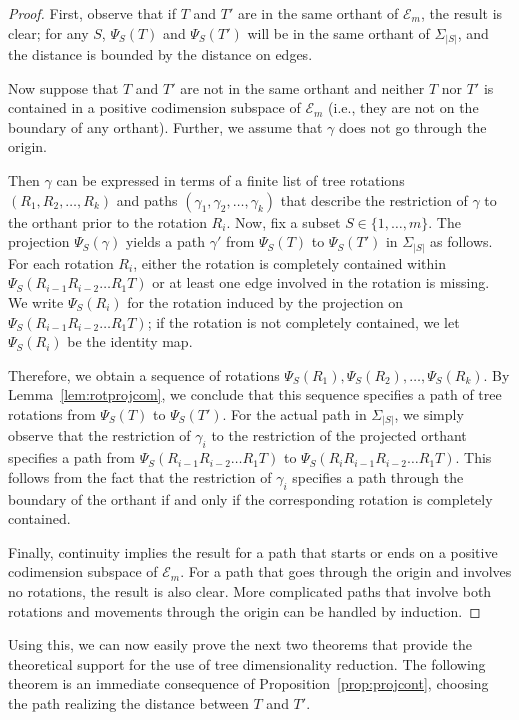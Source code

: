\documentclass[a4paper,11pt]{article}
\newcommand{\aE}{\mathcal{E}}
\begin{document}
\begin{proof}
First, observe that if $T$ and $T'$ are in the same orthant of $\aE_m$, the result is clear; for any $S$, $\Psi_S(T)$ and $\Psi_S(T')$ will be in the same orthant of $\Sigma_{|S|}$, and the distance is bounded by the distance on edges.

Now suppose that $T$ and $T'$ are not in the same orthant and neither $T$ nor $T'$ is contained in a positive codimension subspace of $\aE_m$ (i.e., they are not on the boundary of any orthant).  
Further, we assume that $\gamma$ does not go through the origin. 

Then $\gamma$ can be expressed in terms of a finite list of tree rotations $(R_1, R_2, \ldots, R_k)$ and paths $(\gamma_1, \gamma_2, \ldots, \gamma_k)$ that describe the restriction of $\gamma$ to the orthant prior to the rotation $R_i$.
Now, fix a subset $S \in \{1,\ldots,m\}$.
The projection $\Psi_S(\gamma)$ yields a path $\gamma'$ from $\Psi_S(T)$ to $\Psi_S(T')$ in $\Sigma_{|S|}$ as follows.
For each rotation $R_i$, either the rotation is completely contained within $\Psi_S(R_{i-1} R_{i-2} \ldots R_1 T)$ or at least one edge involved in the rotation is missing.
We write $\Psi_S(R_i)$ for the rotation induced by the projection on $\Psi_S(R_{i-1} R_{i-2} \ldots R_1 T)$; if the rotation is not completely contained, we let $\Psi_S(R_i)$ be the identity map.

Therefore, we obtain a sequence of rotations $\Psi_S(R_1), \Psi_S(R_2), \ldots, \Psi_S(R_k)$.
By Lemma~\ref{lem:rotprojcom}, we conclude that this sequence specifies a path of tree rotations from $\Psi_S(T)$ to $\Psi_S(T')$.
For the actual path in $\Sigma_{|S|}$, we simply observe that the restriction of $\gamma_i$ to the restriction of the projected orthant specifies a path from $\Psi_S(R_{i-1} R_{i-2} \ldots R_1 T)$ to $\Psi_S(R_i R_{i-1} R_{i-2} \ldots R_1 T)$.  This follows from the fact that the restriction of $\gamma_i$ specifies a path through the boundary of the orthant if and only if the corresponding rotation is completely contained.

Finally, continuity implies the result for a path that starts or ends on a positive codimension subspace of $\aE_m$.  For a path that goes through the origin and involves no rotations, the result is also clear.  More complicated paths that involve both rotations and movements through the origin can be handled by induction.
\end{proof}

Using this, we can now easily prove the next two theorems that provide the theoretical support for the use of tree dimensionality reduction.
The following theorem is an immediate consequence of Proposition~\ref{prop:projcont}, choosing the path realizing the distance between $T$ and $T'$.
\end{document}
